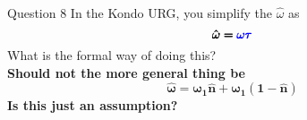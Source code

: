 \documentclass[12pt,aspectratio=169]{beamer}
\newcommand{\qs}[1]{\textbf{\textcolor{bottlegreen}{#1}}}
\begin{document}
\begin{frame}{Question 8}
	In the Kondo URG, you simplify the \(\hat \omega\) as 
\begin{equation*}
	\pmb{\hat \omega = \textcolor{blue}{\omega \tau}}
\end{equation*}
What is the formal way of doing this? \\[10pt]
\qs{Should not the more general thing be 
\begin{equation*}
	\pmb{\hat \omega = \omega_1 \hat n + \omega_1 (1 - \hat n)}
\end{equation*}
Is this just an assumption?
}
\end{frame}
\end{document}
